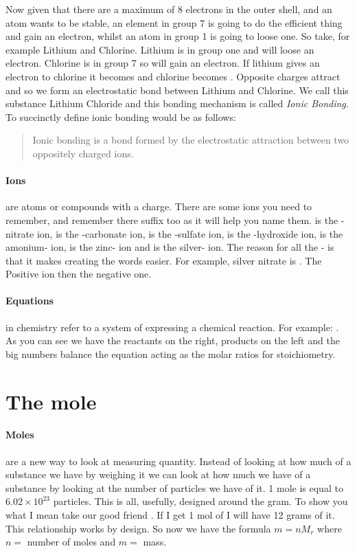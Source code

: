 \documentclass[11pt,a4paper]{memoir}
\begin{document}
	Now given that there are a maximum of 8 electrons in the outer shell, and an atom wants to be stable, an element in group 7 is going to do the efficient thing and gain an electron, whilst an atom in group 1 is going to loose one. So take, for example Lithium and Chlorine. Lithium is in group one and will loose an electron. Chlorine is in group 7 so will gain an electron. If lithium gives an electron to chlorine it becomes  and chlorine becomes . Opposite charges attract and so we form an electrostatic bond between Lithium and Chlorine. We call this substance Lithium Chloride and this bonding mechanism is called \textit{Ionic Bonding}. To succinctly define ionic bonding would be as follows:
	
	 \begin{quote}
	 Ionic bonding is a bond formed by the electrostatic attraction between two oppositely charged ions.
	 \end{quote}
	 
	 \paragraph{Ions} are atoms or compounds with a charge. There are some ions you need to remember, and remember there suffix too as it will help you name them.  is the -nitrate ion,  is the -carbonate ion,  is the -sulfate ion,  is the -hydroxide ion,  is the amonium- ion,  is the zinc- ion and  is the silver- ion. The reason for all the - is that it makes creating the words easier. For example, silver nitrate is . The Positive ion then the negative one.
	
	 
	 \paragraph{Equations} in chemistry refer to a system of expressing a chemical reaction. For example: . As you can see we have the reactants on the right, products on the left and the big numbers balance the equation acting as the molar ratios for stoichiometry.
	 
\section{The mole}
	\paragraph{Moles} are a new way to look at measuring quantity. Instead of looking at how much of a substance we have by weighing it we can look at how much we have of a substance by looking at the number of particles we have of it. 1 mole is equal to $6.02\times 10^{23}$ particles. This is all, usefully, designed around the gram. To show you what I mean take our good friend . If I get 1 mol of  I will have 12 grams of it. This relationship works by design. So now we have the formula $m = nM_r$ where $n =$ number of moles and $m =$ mass.
	 
\end{document}
